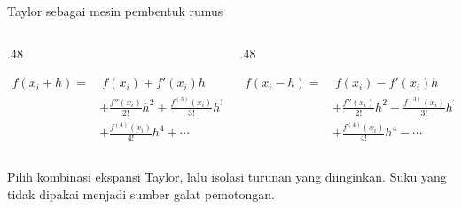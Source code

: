 \documentclass[aspectratio=169,10pt]{beamer}
\begin{document}
\begin{frame}{Taylor sebagai mesin pembentuk rumus}
\scriptsize
\begin{columns}[T,totalwidth=\textwidth]
\begin{column}{.48\textwidth}
\begin{bluebox}
\[
\begin{aligned}
f(x_i+h)=&\ f(x_i)+f'(x_i)h\\
&+\frac{f''(x_i)}{2!}h^2+\frac{f^{(3)}(x_i)}{3!}h^3\\
&+\frac{f^{(4)}(x_i)}{4!}h^4+\cdots
\end{aligned}
\]
\end{bluebox}
\end{column}
\begin{column}{.48\textwidth}
\begin{orangebox}
\[
\begin{aligned}
f(x_i-h)=&\ f(x_i)-f'(x_i)h\\
&+\frac{f''(x_i)}{2!}h^2-\frac{f^{(3)}(x_i)}{3!}h^3\\
&+\frac{f^{(4)}(x_i)}{4!}h^4-\cdots
\end{aligned}
\]
\end{orangebox}
\end{column}
\end{columns}
\vspace{1mm}
\begin{greenbox}
Pilih kombinasi ekspansi Taylor, lalu isolasi turunan yang diinginkan. Suku yang tidak dipakai menjadi sumber galat pemotongan.
\end{greenbox}
\end{frame}
\end{document}
